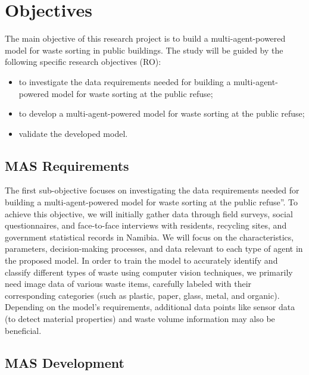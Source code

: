 \section{Objectives}
\label{sec:objectives}

The main objective of this research project is to build a multi-agent-powered model for waste sorting in public buildings. The study will be guided by the following specific research objectives (RO):

\begin{itemize}
  \item to investigate the data requirements needed for building a multi-agent-powered model for waste sorting at the public refuse;
  \item  to develop a multi-agent-powered model for waste sorting at the public refuse;
  \item validate the developed model.
\end{itemize}

\subsection{MAS Requirements}
\label{sub:obj-requirements}

The first sub-objective focuses on investigating the data requirements needed for building a multi-agent-powered model for waste sorting at the public refuse”. To achieve this objective, we will initially gather data through field surveys, social questionnaires, and face-to-face interviews with residents, recycling sites, and government statistical records in Namibia. We will focus on the characteristics, parameters, decision-making processes, and data relevant to each type of agent in the proposed model. In order to train the model to accurately identify and classify different types of waste using computer vision techniques, we primarily need image data of various waste items, carefully labeled with their corresponding categories (such as plastic, paper, glass, metal, and organic). Depending on the model's requirements, additional data points like sensor data (to detect material properties) and waste volume information may also be beneficial.


\subsection{MAS Development}
\label{sub:obj-devs}

